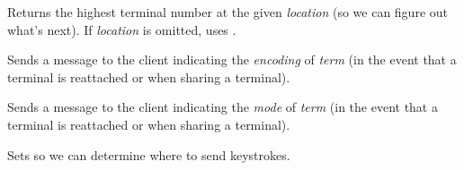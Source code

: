 \documentclass[letterpaper,10pt,openany]{sphinxmanual}
\begin{document}
\begin{fulllineitems}

\begin{fulllineitems}
\label{Applications/terminal/app_terminal:app_terminal.TerminalApplication.highest_term_num}
Returns the highest terminal number at the given \emph{location} (so we can
figure out what's next).  If \emph{location} is omitted, uses
.

\end{fulllineitems}


\begin{fulllineitems}
\label{Applications/terminal/app_terminal:app_terminal.TerminalApplication.send_term_encoding}
Sends a message to the client indicating the \emph{encoding} of \emph{term} (in
the event that a terminal is reattached or when sharing a terminal).

\end{fulllineitems}


\begin{fulllineitems}
\label{Applications/terminal/app_terminal:app_terminal.TerminalApplication.send_term_keyboard_mode}
Sends a message to the client indicating the \emph{mode} of \emph{term} (in
the event that a terminal is reattached or when sharing a terminal).

\end{fulllineitems}


\begin{fulllineitems}
\label{Applications/terminal/app_terminal:app_terminal.TerminalApplication.set_terminal}
Sets  so we can determine where to send
keystrokes.

\end{fulllineitems}



\end{fulllineitems}
\end{document}
